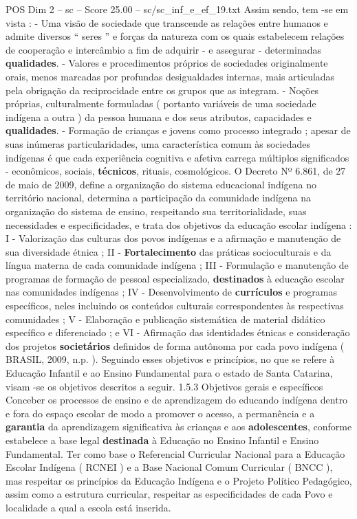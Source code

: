 \begin{textsample}{POS Dim 2 – sc – Score 25.00 – sc/sc\_inf\_e\_ef\_19.txt}
Assim sendo, tem -se em vista : - Uma visão de sociedade que transcende as relações entre humanos e admite diversos “ seres ” e forças da natureza com os quais estabelecem relações de cooperação e intercâmbio a fim de adquirir - e assegurar - determinadas \textbf{qualidades}. - Valores e procedimentos próprios de sociedades originalmente orais, menos marcadas por profundas desigualdades internas, mais articuladas pela obrigação da reciprocidade entre os grupos que as integram. - Noções próprias, culturalmente formuladas ( portanto variáveis de uma sociedade indígena a outra ) da pessoa humana e dos seus atributos, capacidades e \textbf{qualidades}. - Formação de crianças e jovens como processo integrado ; apesar de suas inúmeras particularidades, uma característica comum às sociedades indígenas é que cada experiência cognitiva e afetiva carrega múltiplos significados - econômicos, sociais, \textbf{técnicos}, rituais, cosmológicos.
O Decreto Nº 6.861, de 27 de maio de 2009, define a organização do sistema educacional indígena no território nacional, determina a participação da comunidade indígena na organização do sistema de ensino, respeitando sua territorialidade, suas necessidades e especificidades, e trata dos objetivos da educação escolar indígena : I - Valorização das culturas dos povos indígenas e a afirmação e manutenção de sua diversidade étnica ; II - \textbf{Fortalecimento} das práticas socioculturais e da língua materna de cada comunidade indígena ; III - Formulação e manutenção de programas de formação de pessoal especializado, \textbf{destinados} à educação escolar nas comunidades indígenas ; IV - Desenvolvimento de \textbf{currículos} e programas específicos, neles incluindo os conteúdos culturais correspondentes às respectivas comunidades ; V - Elaboração e publicação sistemática de material didático específico e diferenciado ; e VI - Afirmação das identidades étnicas e consideração dos projetos \textbf{societários} definidos de forma autônoma por cada povo indígena ( BRASIL, 2009, n.p. ).
Seguindo esses objetivos e princípios, no que se refere à Educação Infantil e ao Ensino Fundamental para o estado de Santa Catarina, visam -se os objetivos descritos a seguir. 1.5.3 Objetivos gerais e específicos Conceber os processos de ensino e de aprendizagem do educando indígena dentro e fora do espaço escolar de modo a promover o acesso, a permanência e a \textbf{garantia} da aprendizagem significativa às crianças e aos \textbf{adolescentes}, conforme estabelece a base legal \textbf{destinada} à Educação no Ensino Infantil e Ensino Fundamental.
Ter como base o Referencial Curricular Nacional para a Educação Escolar Indígena ( RCNEI ) e a Base Nacional Comum Curricular ( BNCC ), mas respeitar os princípios da Educação Indígena e o Projeto Político Pedagógico, assim como a estrutura curricular, respeitar as especificidades de cada Povo e localidade a qual a escola está inserida.

\end{textsample}
